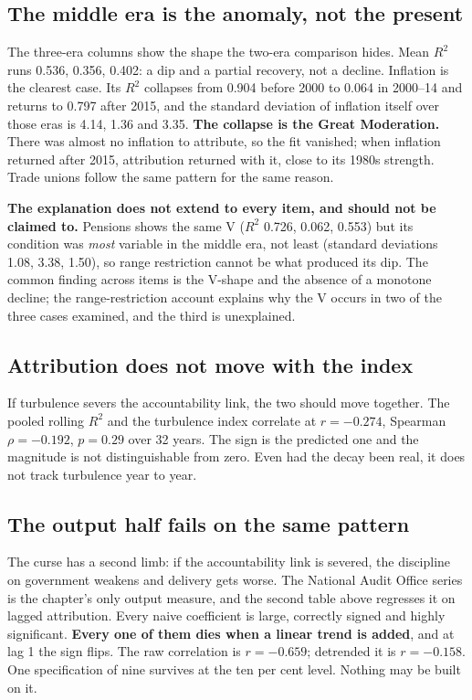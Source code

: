 \subsection*{The middle era is the anomaly, not the present}

The three-era columns show the shape the two-era comparison hides. Mean $R^2$ runs 0.536, 0.356,
0.402: a dip and a partial recovery, not a decline. Inflation is the clearest case. Its $R^2$
collapses from 0.904 before 2000 to 0.064 in 2000--14 and returns to 0.797 after 2015, and the
standard deviation of inflation itself over those eras is 4.14, 1.36 and 3.35. \textbf{The collapse
is the Great Moderation.} There was almost no inflation to attribute, so the fit vanished; when
inflation returned after 2015, attribution returned with it, close to its 1980s strength. Trade
unions follow the same pattern for the same reason.

\textbf{The explanation does not extend to every item, and should not be claimed to.} Pensions shows
the same V ($R^2$ 0.726, 0.062, 0.553) but its condition was \emph{most} variable in the middle era,
not least (standard deviations 1.08, 3.38, 1.50), so range restriction cannot be what produced its
dip. The common finding across items is the V-shape and the absence of a monotone decline; the
range-restriction account explains why the V occurs in two of the three cases examined, and the
third is unexplained.

\subsection*{Attribution does not move with the index}

If turbulence severs the accountability link, the two should move together. The pooled rolling $R^2$
and the turbulence index correlate at $r=-0.274$, Spearman $\rho=-0.192$, $p=0.29$ over 32 years.
The sign is the predicted one and the magnitude is not distinguishable from zero. Even had the decay
been real, it does not track turbulence year to year.

\subsection*{The output half fails on the same pattern}

The curse has a second limb: if the accountability link is severed, the discipline on government
weakens and delivery gets worse. The National Audit Office series is the chapter's only output
measure, and the second table above regresses it on lagged attribution. Every naive coefficient is
large, correctly signed and highly significant. \textbf{Every one of them dies when a linear trend is
added}, and at lag 1 the sign flips. The raw correlation is $r=-0.659$; detrended it is $r=-0.158$.
One specification of nine survives at the ten per cent level. Nothing may be built on it.

